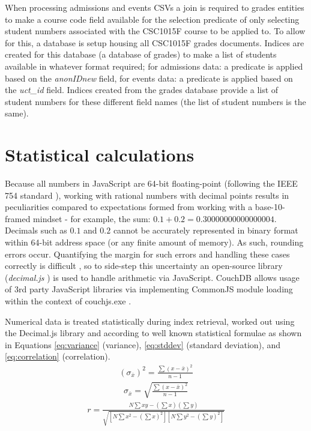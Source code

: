 When processing admissions and events CSVs a join is required to grades entities to make a course code field available for the selection predicate of only selecting student numbers associated with the CSC1015F course to be applied to. To allow for this, a database is setup housing all CSC1015F grades documents. Indices are created for this database (a database of grades) to make a list of students available in whatever format required; for admissions data: a predicate is applied based on the \textit{anonIDnew} field, for events data: a predicate is applied based on the \textit{uct\_id} field. Indices created from the grades database provide a list of student numbers for these different field names (the list of student numbers is the same).

\section{Statistical calculations}
Because all numbers in JavaScript are 64-bit floating-point (following the IEEE 754 standard \cite{floatingPoint}), working with rational numbers with decimal points results in peculiarities compared to expectations formed from working with a base-10-framed mindset - for example, the sum: $0.1 + 0.2 = 0.30000000000000004$. Decimals such as $0.1$ and $0.2$ cannot be accurately represented in binary format within 64-bit address space (or any finite amount of memory). As such, rounding errors occur. Quantifying the margin for such errors and handling these cases correctly is difficult \cite{Goldberg1991}, so to side-step this uncertainty an open-source library (\textit{decimal.js} \cite{decimaljs}) is used to handle arithmetic via JavaScript. CouchDB allows usage of 3rd party JavaScript libraries via implementing CommonJS module loading within the context of couchjs.exe \cite{commonJsMapFn}.

Numerical data is treated statistically during index retrieval, worked out using the Decimal.js library and according to well known statistical formulae as shown in Equations \ref{eq:variance} (variance), \ref{eq:stddev} (standard deviation), and \ref{eq:correlation} (correlation).
\begin{align}
  (\sigma_{\overline{x}})^{2} = \frac{\sum{(x-\bar{x})^2}}{n-1}\label{eq:variance}
\end{align}
\begin{align}
  \sigma_{\overline{x}} = \sqrt{\frac{\sum{(x-\bar{x})^2}}{n-1}}\label{eq:stddev}
\end{align}
\begin{align}
  r = \frac{N\sum{xy} - (\sum{x})(\sum{y})}{\sqrt{[N\sum{x^2} - (\sum{x})^2][N\sum{y^2} - (\sum{y})^2]}} \label{eq:correlation}
\end{align}